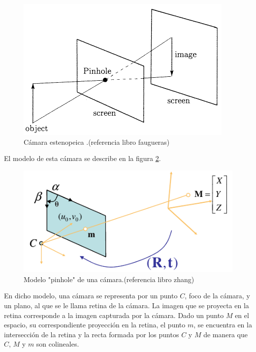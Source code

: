 \begin{figure}[h!]
\begin{center}
\includegraphics[scale=0.5]{img/calibracion/pinhole_camara.png}
\end{center}
\caption{Cámara estenopeica .(referencia libro faugueras)}
\label{pinhole_camara}
\end{figure}


El modelo de esta cámara se describe en la figura \ref{pinhole_modelo}.\\

\begin{figure}[h!]
\begin{center}
\includegraphics[scale=0.7]{img/calibracion/pinhole_modelo.png}
\end{center}
\caption{Modelo "pinhole" de una cámara.(referencia libro zhang)}
\label{pinhole_modelo}
\end{figure}

En dicho modelo, una cámara se representa por un punto $C$, foco de la cámara, y un plano, al  que se le llama retina de la cámara. La imagen que se proyecta en la retina corresponde a la imagen capturada por la cámara. Dado un punto $M$ en el espacio, su correspondiente proyección en la retina, el punto $m$, se encuentra en la intersección de la retina y la recta formada por los puntos $C$ y $M$ de manera que $C$, $M$ y $m$ son colineales.\\ 



